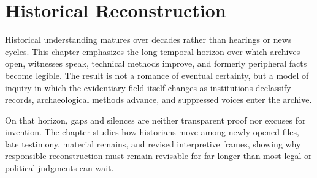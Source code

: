 
\chapter{Historical Reconstruction}
\label{ch:ch090}

Historical understanding matures over decades rather than hearings or news cycles. This chapter emphasizes the long temporal horizon over which archives open, witnesses speak, technical methods improve, and formerly peripheral facts become legible. The result is not a romance of eventual certainty, but a model of inquiry in which the evidentiary field itself changes as institutions declassify records, archaeological methods advance, and suppressed voices enter the archive.

On that horizon, gaps and silences are neither transparent proof nor excuses for invention. The chapter studies how historians move among newly opened files, late testimony, material remains, and revised interpretive frames, showing why responsible reconstruction must remain revisable for far longer than most legal or political judgments can wait.
